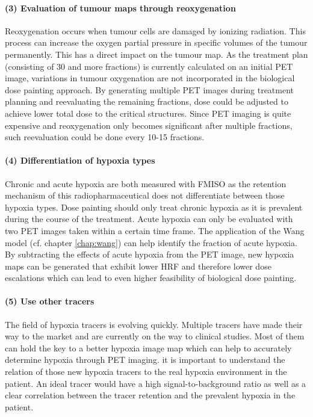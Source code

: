 \paragraph{(3) Evaluation of tumour maps through reoxygenation} Reoxygenation occurs when tumour cells are damaged by ionizing radiation. This process can increase the oxygen partial pressure in specific volumes of the tumour permanently. This has a direct impact on the tumour map. As the treatment plan (consisting of 30 and more fractions) is currently calculated on an initial PET image, variations in tumour oxygenation are not incorporated in the biological dose painting approach. By generating multiple PET images during treatment planning and reevaluating the remaining fractions, dose could be adjusted to achieve lower total dose to the critical structures. Since PET imaging is quite expensive and reoxygenation only becomes significant after multiple fractions, such reevaluation could be done every 10-15 fractions. 
\paragraph{(4) Differentiation of hypoxia types} Chronic and acute hypoxia are both measured with FMISO as the retention mechanism of this radiopharmaceutical does not differentiate between those hypoxia types. Dose painting should only treat chronic hypoxia as it is prevalent during the course of the treatment. Acute hypoxia can only be evaluated with two PET images taken within a certain time frame. The application of the Wang model (cf. chapter \ref{chap:wang}) can help identify the fraction of acute hypoxia. By subtracting the effects of acute hypoxia from the PET image, new hypoxia maps can be generated that exhibit lower HRF and therefore lower dose escalations which can lead to even higher feasibility of biological dose painting.
\paragraph{(5) Use other tracers} The field of hypoxia tracers is evolving quickly. Multiple tracers have made their way to the market and are currently on the way to clinical studies. Most of them can hold the key to a better hypoxia image map which can help to accurately determine hypoxia through PET imaging. it is important to understand the relation of those new hypoxia tracers to the real hypoxia environment in the patient. An ideal tracer would have a high signal-to-background ratio as well as a clear correlation between the tracer retention and the prevalent hypoxia in the patient. 
